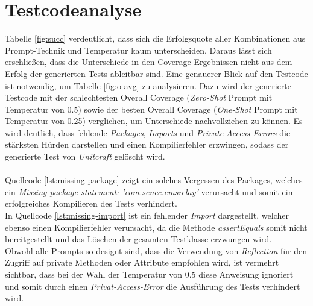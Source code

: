 \section{Testcodeanalyse}
Tabelle \ref{fig:succ} verdeutlicht, dass sich die Erfolgsquote aller Kombinationen aus Prompt-Technik und Temperatur kaum unterscheiden. Daraus lässt sich erschließen, dass die Unterschiede in den Coverage-Ergebnissen nicht aus dem Erfolg der generierten Tests ableitbar sind. Eine genauerer Blick auf den Testcode ist notwendig, um Tabelle \ref{fig:o-avg} zu analysieren. Dazu wird der generierte Testcode mit der schlechtesten Overall Coverage (\textit{Zero-Shot} Prompt mit Temperatur von 0.5) sowie der besten Overall Coverage (\textit{One-Shot} Prompt mit Temperatur von 0.25) verglichen, um Unterschiede nachvollziehen zu können. Es wird deutlich, dass fehlende \textit{Packages}, \textit{Imports} und \textit{Private-Access-Errors} die stärksten Hürden darstellen und einen Kompilierfehler erzwingen, sodass der generierte Test von \textit{Unitcraft} gelöscht wird. \\\\
Quellcode \ref{lst:missing-package} zeigt ein solches Vergessen des Packages, welches ein \textit{Missing package statement: 'com.senec.emsrelay'} verursacht und somit ein erfolgreiches Kompilieren des Tests verhindert.\\

In Quellcode \ref{lst:missing-import} ist ein fehlender \textit{Import} dargestellt, welcher ebenso einen Kompilierfehler verursacht, da die Methode \textit{assertEquals} somit nicht bereitgestellt und das Löschen der gesamten Testklasse erzwungen wird.\\

Obwohl alle Prompts so designt sind, dass die Verwendung von \textit{Reflection} für den Zugriff auf private Methoden oder Attribute empfohlen wird, ist vermehrt sichtbar, dass bei der Wahl der Temperatur von 0.5 diese Anweisung ignoriert und somit durch einen \textit{Privat-Access-Error} die Ausführung des Tests verhindert wird.\\

